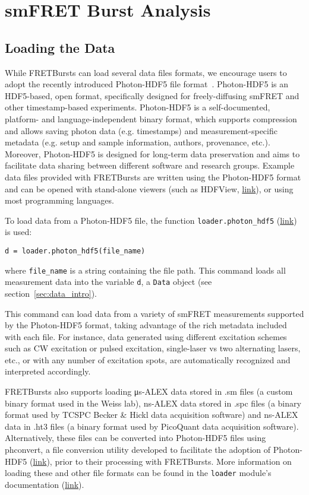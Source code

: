 \section{smFRET Burst Analysis}
\label{sec:analysis}

\subsection{Loading the Data}
\label{sec:dataload}
While FRETBursts can load several data files formats,
we encourage users to adopt the recently introduced Photon-HDF5 file format~\cite{Ingargiola2016}.
Photon-HDF5 is an HDF5-based, open format, specifically designed for freely-diffusing smFRET and other timestamp-based experiments.
Photon-HDF5 is a self-documented, platform- and language-independent binary format,
which supports compression and allows saving photon data (e.g. timestamps) and measurement-specific metadata
(e.g. setup and sample information, authors, provenance, etc.).
Moreover, Photon-HDF5 is designed for long-term data preservation and aims to facilitate data sharing
between different software and research groups.
Example data files provided with FRETBursts are written using the Photon-HDF5 format and can be opened with
stand-alone viewers (such as HDFView, \href{http://www.hdfgroup.org/products/java/hdfview/}{link}), or using most
programming languages.

To load data from a Photon-HDF5 file, the function \verb|loader.photon_hdf5|
(\href{http://fretbursts.readthedocs.org/en/latest/loader.html#fretbursts.loader.photon_hdf5}{link})
is used:

\begin{lstlisting}
d = loader.photon_hdf5(file_name)
\end{lstlisting}

\noindent
where \verb|file_name| is a string containing the file path.
This command loads all measurement data into the variable \verb|d|, 
a \verb|Data| object (see section~\ref{sec:data_intro}).

This command can load data from a variety of smFRET measurements supported
by the Photon-HDF5 format, taking advantage of the rich metadata included with each file.
For instance, data generated using different excitation schemes such as CW excitation or pulsed excitation, single-laser vs two alternating lasers, etc., or with any number of excitation spots, are automatically recognized and interpreted accordingly.

FRETBursts also supports loading μs-ALEX data stored in .sm files
(a custom binary format used in the Weiss lab),
ns-ALEX data stored in .spc files (a binary format used by TCSPC Becker \& Hickl data acquisition software) and
ns-ALEX data in .ht3 files (a binary format used by PicoQuant data acquisition software).
Alternatively, these files can be converted into Photon-HDF5 files using phconvert, a file conversion utility developed to facilitate the adoption of Photon-HDF5 (\href{http://photon-hdf5.github.io/phconvert/}{link}), prior to their processing with FRETBursts.
More information on loading these and other file formats 
can be found in the \verb|loader| module's documentation
(\href{http://fretbursts.readthedocs.org/en/latest/loader.html}{link}).

